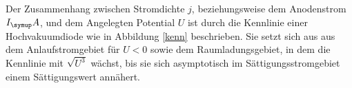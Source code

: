 Der Zusammenhang zwischen Stromdichte $j$, beziehungsweise dem Anodenstrom $I_\su{A}$,
und dem Angelegten Potential $U$ ist durch die Kennlinie einer Hochvakuumdiode
wie in Abbildung \ref{kenn} beschrieben.
Sie setzt sich aus aus dem Anlaufstromgebiet für $U<0$ sowie dem Raumladungsgebiet,
in dem die Kennlinie mit $\sqrt{U^3}$ wächst, bis sie sich asymptotisch im
Sättigungsstromgebiet einem Sättigungswert annähert.
